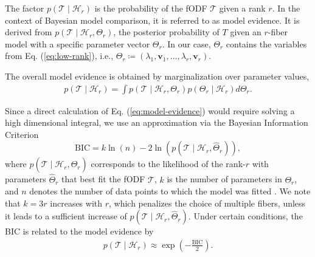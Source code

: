 The factor $p \left( \mathcal{T} \mid \mathcal{H}_r \right)$ is the
probability of the fODF $\mathcal{T}$ given a rank $r$. In the context of
Bayesian model comparison, it is referred to as model evidence. It is derived from $p
\left( \mathcal{T} \mid \mathcal{H}_r , \Theta_r \right)$, the posterior
probability of $T$ given an $r$-fiber model with a specific parameter vector
$\Theta_r$. In our case, $\Theta_r$ contains the variables from Eq.
(\ref{eq:low-rank}), i.e., $\Theta_r \coloneqq \left( \lambda_1 , \mathbf{v}_1 , \dots
, \lambda_r , \mathbf{v}_r \right)$. 

The overall model evidence is obtained by marginalization over parameter values,
\begin{align}
	p \left( \mathcal{T} \mid \mathcal{H}_r \right) = \int p \left(
		\mathcal{T} \mid \mathcal{H}_r , \Theta_r 
	\right) p \left( \Theta_r \mid \mathcal{H}_r  \right) d \Theta_r. 
	\label{eq:model-evidence}
\end{align}

Since a direct calculation of Eq. (\ref{eq:model-evidence}) would require solving a
high dimensional integral, we use an approximation via the Bayesian Information
Criterion
\[ \text{BIC} = k \ln \left( n \right) - 2 \ln \left( p \left( \mathcal{T} \mid
\mathcal{H}_r, \hat{\Theta}_r \right) \right), \]
where $p \left(  \mathcal{T} \mid \mathcal{H}_r , \hat{\Theta}_r \right)$
corresponds to the likelihood of the rank-$r$ with parameters $\hat{\Theta}_r$
that best fit the fODF $\mathcal{T}$, $k$ is the number of parameters in
$\Theta_r$, and $n$ denotes the number of data points to which the model was
fitted \cite{Schwarz1978}. We note that $k=3r$ increases with $r$, which penalizes the choice of multiple fibers, unless it leads to a sufficient increase of $p \left(  \mathcal{T} \mid \mathcal{H}_r , \hat{\Theta}_r \right)$. Under certain conditions, the BIC is related to the
model evidence by \cite{Konishi2008}
\begin{align}
	p \left( \mathcal{T} \mid \mathcal{H}_r \right) \approx \exp \left(  -
		\frac{\text{BIC}}{2}
\right).
	\label{eq:BIC-model}
\end{align}

